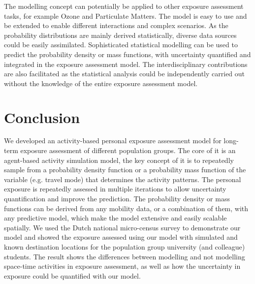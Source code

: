 \documentclass[]{article}
\begin{document}
The modelling concept can potentially be applied to other exposure assessment tasks, for example Ozone and Particulate Matters. The model is easy to use and be extended to enable different interactions and complex scenarios. As the probability distributions are mainly derived statistically, diverse data sources could be easily assimilated. Sophisticated statistical modelling can be used to predict the probability density or mass functions, with uncertainty quantified and integrated in the exposure assessment model. The interdisciplinary contributions are also facilitated as the statistical analysis could be independently carried out without the knowledge of the entire exposure assessment model. 

\section{Conclusion}
\label{sec:con}

We developed an activity-based personal exposure assessment model for long-term exposure assessment of different population groups. The core of it is an agent-based activity simulation model, the key concept of it is to repeatedly sample from a probability density function or a probability mass function of the variable (e.g. travel mode) that determines the activity patterns. The personal exposure is repeatedly assessed in multiple iterations to allow uncertainty quantification and improve the prediction. The probability density or mass functions can be derived from any mobility data, or a combination of them, with any predictive model, which make the model extensive and easily scalable spatially. We used the Dutch national micro-census survey to demonstrate our model and showed the exposure assessed using our model with simulated and known destination locations for the population group university (and colleague) students. The result shows the differences between modelling and not modelling space-time activities in exposure assessment, as well as how the uncertainty in exposure could be quantified with our model. 


\newpage


\end{document}
